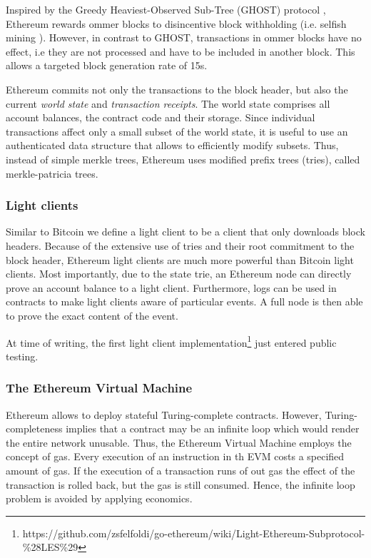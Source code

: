 Inspired by the Greedy Heaviest-Observed Sub-Tree (GHOST) protocol \parencite{cryptoeprint:2013:881}, Ethereum rewards ommer blocks to disincentive block withholding (i.e. selfish mining \parencite{Eyal2014}). However, in contrast to GHOST, transactions in ommer blocks have no effect, i.e they are not processed and have to be included in another block. This allows a targeted block generation rate of 15s.  

Ethereum commits not only the transactions to the block header, but also the current \emph{world state} and \emph{transaction receipts}. The world state comprises all account balances, the contract code and their storage. Since individual transactions affect only a small subset of the world state, it is useful to use an authenticated data structure that allows to efficiently modify subsets. Thus, instead of simple merkle trees, Ethereum uses modified prefix trees (tries), called merkle-patricia trees.

\subsubsection{Light clients}
\label{sec:eth_lightclient}

Similar to Bitcoin we define a light client to be a client that only downloads block headers. Because of the extensive use of tries and their root commitment to the block header, Ethereum light clients are much more powerful than Bitcoin light clients. 
Most importantly, due to the state trie, an Ethereum node can directly prove an account balance to a light client. Furthermore, logs can be used in contracts to make light clients aware of particular events. A full node is then able to prove the exact content of the event.

At time of writing, the first light client implementation\footnote{https://github.com/zsfelfoldi/go-ethereum/wiki/Light-Ethereum-Subprotocol-\%28LES\%29} just entered public testing.

\subsubsection{The Ethereum Virtual Machine}

Ethereum allows to deploy stateful Turing-complete contracts. However, Turing-completeness implies that a contract may be an infinite loop which would render the entire network unusable. Thus, the Ethereum Virtual Machine employs the concept of gas. Every execution of an instruction in th EVM costs a specified amount of gas. If the execution of a transaction runs of out gas the effect of the transaction is rolled back, but the gas is still consumed. Hence, the infinite loop problem is avoided by applying economics.

